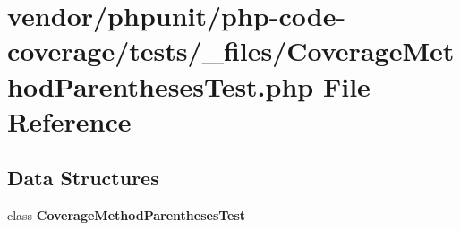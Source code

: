 \section{vendor/phpunit/php-\/code-\/coverage/tests/\+\_\+files/\+Coverage\+Method\+Parentheses\+Test.php File Reference}
\label{php-code-coverage_2tests_2__files_2_coverage_method_parentheses_test_8php}
\subsection*{Data Structures}
\begin{DoxyCompactItemize}
\item 
class {\bf Coverage\+Method\+Parentheses\+Test}
\end{DoxyCompactItemize}
